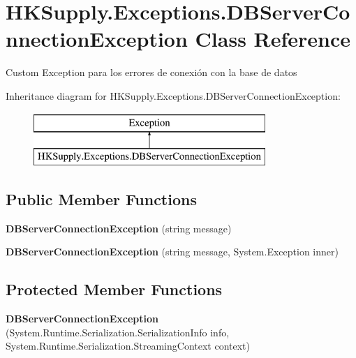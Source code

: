 \hypertarget{class_h_k_supply_1_1_exceptions_1_1_d_b_server_connection_exception}{}\section{H\+K\+Supply.\+Exceptions.\+D\+B\+Server\+Connection\+Exception Class Reference}
\label{class_h_k_supply_1_1_exceptions_1_1_d_b_server_connection_exception}


Custom Exception para los errores de conexión con la base de datos  


Inheritance diagram for H\+K\+Supply.\+Exceptions.\+D\+B\+Server\+Connection\+Exception\+:\begin{figure}[H]
\begin{center}
\leavevmode
\includegraphics[height=2.000000cm]{class_h_k_supply_1_1_exceptions_1_1_d_b_server_connection_exception}
\end{center}
\end{figure}
\subsection*{Public Member Functions}
\begin{DoxyCompactItemize}
\item 
\mbox{\label{class_h_k_supply_1_1_exceptions_1_1_d_b_server_connection_exception_a7b3040b56aef6f2ebbf97508beaa79b0}} 
{\bfseries D\+B\+Server\+Connection\+Exception} (string message)
\item 
\mbox{\label{class_h_k_supply_1_1_exceptions_1_1_d_b_server_connection_exception_ace664805be2e431a477d1b11864f71b3}} 
{\bfseries D\+B\+Server\+Connection\+Exception} (string message, System.\+Exception inner)
\end{DoxyCompactItemize}
\subsection*{Protected Member Functions}
\begin{DoxyCompactItemize}
\item 
\mbox{\label{class_h_k_supply_1_1_exceptions_1_1_d_b_server_connection_exception_a4c0c86363505626ea8f398064a525c6a}} 
{\bfseries D\+B\+Server\+Connection\+Exception} (System.\+Runtime.\+Serialization.\+Serialization\+Info info, System.\+Runtime.\+Serialization.\+Streaming\+Context context)
\end{DoxyCompactItemize}


